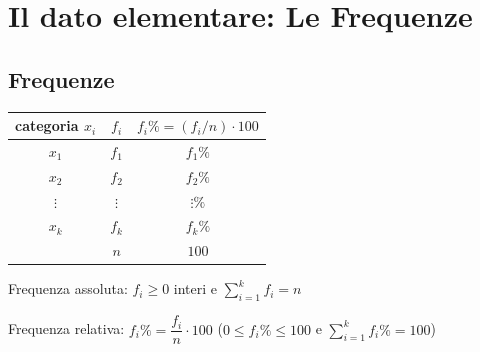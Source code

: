 \documentclass[compress]{beamer}
\begin{document}
\section[Frequenze]{Il dato elementare: Le Frequenze}

\subsection*{Frequenze}

\begin{frame}

		\begin{table}
				\centering
				\begin{tabular}{|c | c | c |}
				\hline
				categoria $x_i$ & $f_i$ & 	$f_i\% = (f_i/n) \cdot 100$ \\
				\hline
				$x_1$ & $f_1$ & $f_1\%$ \\
				$x_2$ & $f_2$ & $f_2\%$ \\
				$\vdots$ & $\vdots$ & $\vdots\%$ \\
				$x_k$ & $f_k$ & $f_k\%$ \\
				\hline
			   & $n$ & $100$ \\
			   \hline
				\end{tabular}
			\end{table}
			
\vspace{3mm}
Frequenza assoluta:	$f_i \ge 0$ interi e $\sum_{i=1}^{k} f_i = n$

Frequenza relativa: 	$f_i\% = \dfrac{f_i}{n} \cdot 100$ ($0 \leq f_i\% \leq 100$ e $\sum_{i=1}^{k} f_i\% = 100$)
\end{frame}
\end{document}
